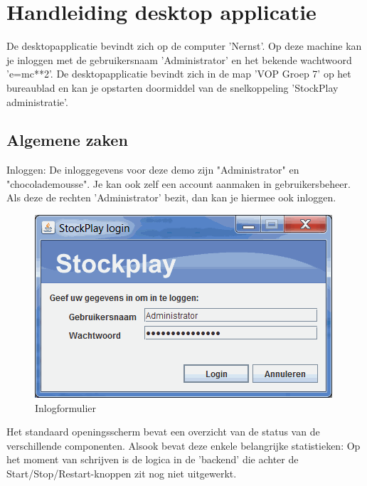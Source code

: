 \chapter{Handleiding desktop applicatie}

De desktopapplicatie bevindt zich op de computer 'Nernst'.
Op deze machine kan je inloggen met de gebruikersnaam 'Administrator' en het bekende wachtwoord 'e=mc**2'.
De desktopapplicatie bevindt zich in de map 'VOP Groep 7' op het bureaublad en kan je opstarten doormiddel van de snelkoppeling 'StockPlay administratie'.

\section{Algemene zaken}

Inloggen:
De inloggegevens voor deze demo zijn "Administrator" en "chocolademousse". Je kan ook zelf een account aanmaken in gebruikersbeheer. Als deze de rechten 'Administrator' bezit, dan kan je hiermee ook inloggen.

\begin{figure}[h!]
	\centering
		\includegraphics[width=\textwidth]{images/handleiding/handleiding1.png}
	\caption{Inlogformulier}
\end{figure}

Het standaard openingsscherm bevat een overzicht van de status van de verschillende componenten.
Alsook bevat deze enkele belangrijke statistieken:
Op het moment van schrijven is de logica in de 'backend' die achter de Start/Stop/Restart-knoppen zit nog niet uitgewerkt.

